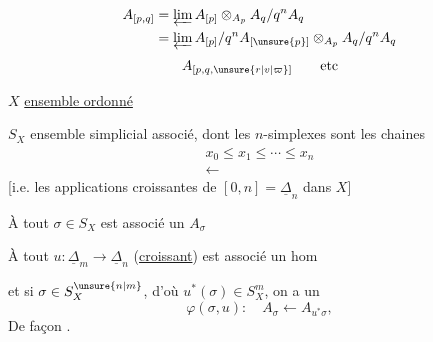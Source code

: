 \[
\begin{aligned}
A_{[p,q]}&=\varprojlim A_{[p]}\otimes_{A_p}A_q/q^n A_q\\
&=\varprojlim A_{[p]}/q^n A_{[\unsure{p}]}\otimes_{A_p}A_q/q^n A_q
\end{aligned}
\]
\[A_{[p,q,\unsure{r|v|\varpi}]}\qquad\text{etc}\]

$X$ \uline{ensemble ordonné}

$S_X$ ensemble simplicial associé, dont les $n$-simplexes sont les chaines
\[
\begin{aligned}
x_0\leq x_1\leq\cdots\leq x_n\\
\longleftarrow
\end{aligned}
\]
[i.e. les applications croissantes de $[0,n]=\underline\Delta_n$ dans $X$]

À tout $\sigma\in S_X$ est associé un $A_\sigma$

À tout    $u:\underline\Delta_m\longrightarrow\underline\Delta_n$ (\uline{croissant}) est associé un hom

et si $\sigma\in S_X^{\unsure{n|m}}$, d'où $u^*(\sigma)\in S_X^m$, on a un 
\[
\varphi(\sigma,u):\quad A_\sigma\longleftarrow A_{u^*\sigma},
\]
De façon .
